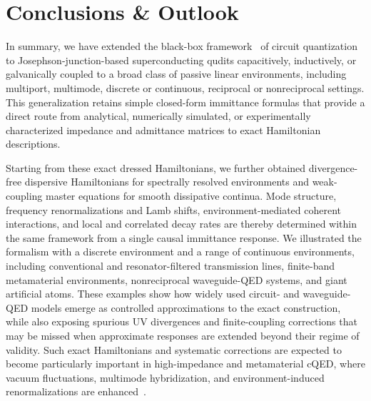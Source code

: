 \documentclass[prx,aps,twocolumn,article]{revtex4-2}
\begin{document}
\section{Conclusions \& Outlook}
\label{Sec:ConclusionsOutlook}

In summary, we have extended the black-box framework~\cite{Nigg:2012,Solgun:2014,Solgun:2015,ParraRodriguez:2019,Solgun:2019,MinevEPR:2021,Labarca:2024,ParraRodriguez:2025} of circuit quantization to Josephson-junction-based superconducting qudits capacitively, inductively, or galvanically coupled to a broad class of passive linear environments, including multiport, multimode, discrete or continuous, reciprocal or nonreciprocal settings. This generalization retains simple closed-form immittance formulas that provide a direct route from analytical, numerically simulated, or experimentally characterized impedance and admittance matrices to exact Hamiltonian descriptions.

Starting from these exact dressed Hamiltonians, we further obtained divergence-free dispersive Hamiltonians for spectrally resolved environments and weak-coupling master equations for smooth dissipative continua. Mode structure, frequency renormalizations and Lamb shifts, environment-mediated coherent interactions, and local and correlated decay rates are thereby determined within the same framework from a single causal immittance response. We illustrated the formalism with a discrete environment and a range of continuous environments, including conventional and resonator-filtered transmission lines, finite-band metamaterial environments, nonreciprocal waveguide-QED systems, and giant artificial atoms. These examples show how widely used circuit- and waveguide-QED models emerge as controlled approximations to the exact construction, while also exposing spurious UV divergences and finite-coupling corrections that may be missed when approximate responses are extended beyond their regime of validity. Such exact Hamiltonians and systematic corrections are expected to become particularly important in high-impedance and metamaterial \gls{cQED}, where vacuum fluctuations, multimode hybridization, and environment-induced renormalizations are enhanced~\cite{PuertasMartinez:2019,Leger:2019,Pechenezhskiy:2020,Kuzmin:2025}.
\end{document}
